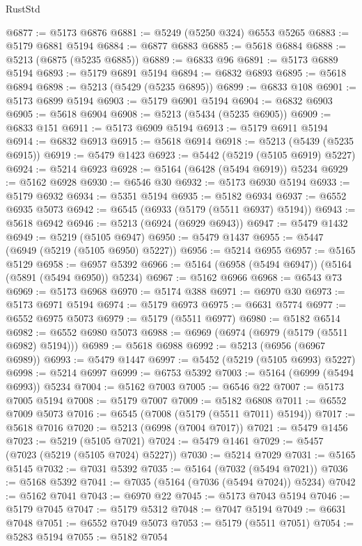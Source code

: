 \begin{lexlean}{RustStd}
\begin{coremodule}
@6877 := @5173 @6876
@6881 := @5249 (@5250 @324) @6553 @5265
@6883 := @5179 @6881 @5194
@6884 := @6877 @6883
@6885 := @5618 @6884
@6888 := @5213 (@6875 (@5235 @6885))
@6889 := @6833 @96
@6891 := @5173 @6889 @5194
@6893 := @5179 @6891 @5194
@6894 := @6832 @6893
@6895 := @5618 @6894
@6898 := @5213 (@5429 (@5235 @6895))
@6899 := @6833 @108
@6901 := @5173 @6899 @5194
@6903 := @5179 @6901 @5194
@6904 := @6832 @6903
@6905 := @5618 @6904
@6908 := @5213 (@5434 (@5235 @6905))
@6909 := @6833 @151
@6911 := @5173 @6909 @5194
@6913 := @5179 @6911 @5194
@6914 := @6832 @6913
@6915 := @5618 @6914
@6918 := @5213 (@5439 (@5235 @6915))
@6919 := @5479 @1423
@6923 := @5442 (@5219 (@5105 @6919) @5227)
@6924 := @5214 @6923
@6928 := @5164 (@6428 (@5494 @6919)) @5234
@6929 := @5162 @6928
@6930 := @6546 @30
@6932 := @5173 @6930 @5194
@6933 := @5179 @6932
@6934 := @5351 @5194
@6935 := @5182 @6934
@6937 := @6552 @6935 @5073
@6942 := @6545 (@6933 (@5179 (@5511 @6937) @5194))
@6943 := @5618 @6942
@6946 := @5213 (@6924 (@6929 @6943))
@6947 := @5479 @1432
@6949 := @5219 (@5105 @6947)
@6950 := @5479 @1437
@6955 := @5447 (@6949 (@5219 (@5105 @6950) @5227))
@6956 := @5214 @6955
@6957 := @5165 @5129
@6958 := @6957 @5392
@6966 := @5164 (@6958 (@5494 @6947)) (@5164 (@5891 (@5494 @6950)) @5234)
@6967 := @5162 @6966
@6968 := @6543 @73
@6969 := @5173 @6968
@6970 := @5174 @388
@6971 := @6970 @30
@6973 := @5173 @6971 @5194
@6974 := @5179 @6973
@6975 := @6631 @5774
@6977 := @6552 @6975 @5073
@6979 := @5179 (@5511 @6977)
@6980 := @5182 @6514
@6982 := @6552 @6980 @5073
@6988 := @6969 (@6974 (@6979 (@5179 (@5511 @6982) @5194)))
@6989 := @5618 @6988
@6992 := @5213 (@6956 (@6967 @6989))
@6993 := @5479 @1447
@6997 := @5452 (@5219 (@5105 @6993) @5227)
@6998 := @5214 @6997
@6999 := @6753 @5392
@7003 := @5164 (@6999 (@5494 @6993)) @5234
@7004 := @5162 @7003
@7005 := @6546 @22
@7007 := @5173 @7005 @5194
@7008 := @5179 @7007
@7009 := @5182 @6808
@7011 := @6552 @7009 @5073
@7016 := @6545 (@7008 (@5179 (@5511 @7011) @5194))
@7017 := @5618 @7016
@7020 := @5213 (@6998 (@7004 @7017))
@7021 := @5479 @1456
@7023 := @5219 (@5105 @7021)
@7024 := @5479 @1461
@7029 := @5457 (@7023 (@5219 (@5105 @7024) @5227))
@7030 := @5214 @7029
@7031 := @5165 @5145
@7032 := @7031 @5392
@7035 := @5164 (@7032 (@5494 @7021))
@7036 := @5168 @5392
@7041 := @7035 (@5164 (@7036 (@5494 @7024)) @5234)
@7042 := @5162 @7041
@7043 := @6970 @22
@7045 := @5173 @7043 @5194
@7046 := @5179 @7045
@7047 := @5179 @5312
@7048 := @7047 @5194
@7049 := @6631 @7048
@7051 := @6552 @7049 @5073
@7053 := @5179 (@5511 @7051)
@7054 := @5283 @5194
@7055 := @5182 @7054

\end{coremodule}
\end{lexlean}
